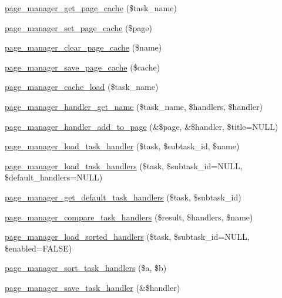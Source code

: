 \begin{DoxyCompactItemize}
\item 
\hyperlink{page__manager_8module_a37bf1f336f11680f111b980f1f06f7bb}{page\_\-manager\_\-get\_\-page\_\-cache} (\$task\_\-name)
\item 
\hyperlink{page__manager_8module_a87718088cd075fb9c3c6884df0e33212}{page\_\-manager\_\-set\_\-page\_\-cache} (\$page)
\item 
\hyperlink{page__manager_8module_ae48efa1de270237e9dcb4d117cb063a9}{page\_\-manager\_\-clear\_\-page\_\-cache} (\$name)
\item 
\hyperlink{page__manager_8module_a5e03ee6eaeb49ed077fac91648d381b4}{page\_\-manager\_\-save\_\-page\_\-cache} (\$cache)
\item 
\hyperlink{page__manager_8module_a39f5ee30c6173dd1332d1b60cbdb33fd}{page\_\-manager\_\-cache\_\-load} (\$task\_\-name)
\item 
\hyperlink{page__manager_8module_abc975a3dfef28560a3db49a0399a930d}{page\_\-manager\_\-handler\_\-get\_\-name} (\$task\_\-name, \$handlers, \$handler)
\item 
\hyperlink{page__manager_8module_abcdccf5848b9ac0922724ad19a56c8ae}{page\_\-manager\_\-handler\_\-add\_\-to\_\-page} (\&\$page, \&\$handler, \$title=NULL)
\item 
\hyperlink{page__manager_8module_a512d52ff2d441ac923a6dd5ffbff2aa5}{page\_\-manager\_\-load\_\-task\_\-handler} (\$task, \$subtask\_\-id, \$name)
\item 
\hyperlink{page__manager_8module_a3752551ca408f4c39310c0c1bf7ea787}{page\_\-manager\_\-load\_\-task\_\-handlers} (\$task, \$subtask\_\-id=NULL, \$default\_\-handlers=NULL)
\item 
\hyperlink{page__manager_8module_a1c50184f40b1e3f5af6da2ffca019d62}{page\_\-manager\_\-get\_\-default\_\-task\_\-handlers} (\$task, \$subtask\_\-id)
\item 
\hyperlink{page__manager_8module_aa02498e4dadcc2146ba01fbc0a2e6492}{page\_\-manager\_\-compare\_\-task\_\-handlers} (\$result, \$handlers, \$name)
\item 
\hyperlink{page__manager_8module_aefe7c3f4d0d7b54cdaea1dea28d6171e}{page\_\-manager\_\-load\_\-sorted\_\-handlers} (\$task, \$subtask\_\-id=NULL, \$enabled=FALSE)
\item 
\hyperlink{page__manager_8module_a40e9b153aba4e968d1053f0eeb321d9c}{page\_\-manager\_\-sort\_\-task\_\-handlers} (\$a, \$b)
\item 
\hyperlink{page__manager_8module_ab349a10c030f96d61677ded4865a8988}{page\_\-manager\_\-save\_\-task\_\-handler} (\&\$handler)
\item 

\end{DoxyCompactItemize}
